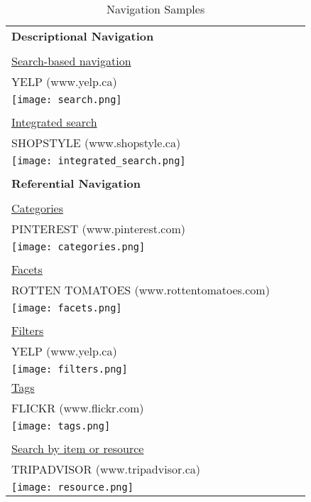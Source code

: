 \label{chapter:appendix_features}


\begin{longtable}{|p{0.90\linewidth}|}
\caption{Navigation Samples}\\
\hline
\textbf{Descriptional Navigation} 		\\	
\\
\underline{Search-based navigation}	\\	
YELP (www.yelp.ca)\\	
\texttt{[image: search.png]}\\
\\
\underline{Integrated search}				\\
SHOPSTYLE (www.shopstyle.ca)\\
\texttt{[image: integrated\_search.png]}\\
\\
\hline
\pagebreak
\hline
\textbf{Referential Navigation}       		\\
\\
\underline{Categories}		\\	
PINTEREST (www.pinterest.com)	\\ 		
\texttt{[image: categories.png]}\\
\\
\underline{Facets}				    		\\
ROTTEN TOMATOES (www.rottentomatoes.com)\\
\texttt{[image: facets.png]}\\
\\
\hline
\pagebreak
\hline
\underline{Filters}					  		\\
YELP (www.yelp.ca)\\
\texttt{[image: filters.png]}\\

\underline{Tags}\\
FLICKR (www.flickr.com)				      		\\
\texttt{[image: tags.png]}\\
\\
\underline{Search by item or resource}		\\
TRIPADVISOR (www.tripadvisor.ca)\\
\texttt{[image: resource.png]}\\


\end{longtable}
